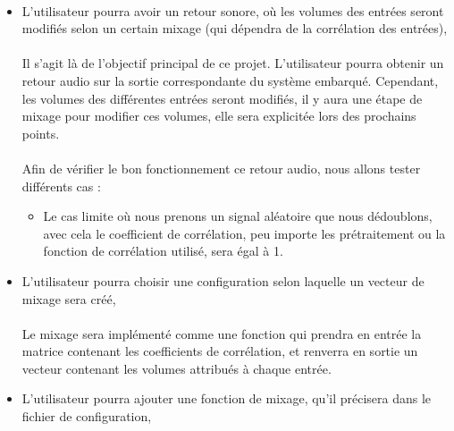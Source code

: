 \documentclass{article}
\begin{document}
\paragraph{}
\begin{itemize}
 \item L'utilisateur pourra avoir un retour sonore, où les volumes des
       entrées seront modifiés selon un certain mixage (qui dépendra de la
       corrélation des entrées),
       \paragraph{}
       Il s'agit là de l'objectif principal de ce projet. L'utilisateur pourra
       obtenir un retour audio sur la sortie correspondante du système embarqué.
       Cependant, les volumes des différentes entrées seront modifiés, il y
       aura une étape de mixage pour modifier ces volumes, elle sera explicitée
       lors des prochains points.
       \paragraph{}
       Afin de vérifier le bon fonctionnement ce retour audio, nous allons tester
       différents cas :
       \begin{itemize}
        \item Le cas limite où nous prenons un signal aléatoire que nous dédoublons, avec
              cela le coefficient de corrélation, peu importe les prétraitement ou la fonction de
              corrélation utilisé, sera égal à 1.  
       \end{itemize}
       
       
 \item L'utilisateur pourra choisir une configuration selon laquelle un
       vecteur de mixage sera créé,
       \paragraph{}
       Le mixage sera implémenté comme une fonction qui prendra en entrée la
       matrice contenant les coefficients de corrélation, et renverra en sortie
       un vecteur contenant les volumes attribués à chaque entrée.\\
       
 \item L'utilisateur pourra ajouter une fonction de mixage, qu'il précisera
       dans le fichier de configuration,

\end{itemize}
\end{document}
